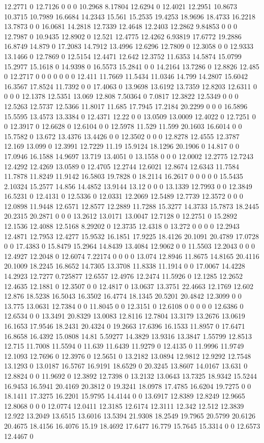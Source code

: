 12.2771 0 12.7126 0 0 0 10.2968 8.17804 12.6294 0 12.4021 12.2951 10.8673 10.3715 10.7989 16.6684 14.2343 15.561 15.2535 19.4253 18.9696 18.4733 16.2218 13.7873 0 0 16.0681 14.2818 12.7339 12.4648 12.2403 12.2862 9.84853 0 0 0 12.7987 0 10.9435 12.8902 0 12.521 12.4775 12.4262 6.93819 17.6772 19.2886 16.8749 14.879 0 17.2083 14.7912 13.4996 12.6296 12.7809 0 12.3058 0 0 12.9333 13.1466 0 12.7869 0 12.5154 12.4471 12.642 12.3752 11.6353 14.5874 15.0799 15.2977 15.1618 0 14.9398 0 16.5573 15.2841 0 0 14.2164 13.7286 0 12.8826 12.485 0 12.2717 0 0 0 0 0 0 0 12.411 11.7669 11.5434 11.0346 14.799 14.2807 15.6042 16.3567 17.8524 11.7392 0 0 17.4063 0 13.9698 13.6192 13.7359 12.8203 12.6311 0 0 0 0 12.1378 12.5351 13.069 12.808 7.50364 0 7.0817 12.3822 12.5349 0 0 0 12.5263 12.5737 12.5366 11.8017 11.685 17.7945 17.2184 20.2299 0 0 0 16.5896 15.5595 13.4573 13.3384 0 12.4371 12.22 0 0 13.0509 13.0009 12.4022 0 12.7251 0 0 12.3917 0 12.6628 0 12.6104 0 0 12.5978 11.529 11.599 20.1603 16.6014 0 0 15.7582 0 13.672 13.4376 13.4426 0 0 12.3502 0 0 0 12.8278 12.4555 12.3787 12.169 13.099 0 12.3991 12.7229 11.19 15.9124 18.1296 20.1906 0 14.817 0 0 17.0946 16.1588 14.9697 13.719 13.4051 0 13.1558 0 0 0 12.0002 12.2775 12.7243 12.4292 12.4269 13.0589 0 12.4705 12.2744 12.6021 12.8674 12.6343 11.7584 11.7878 11.8249 11.9142 16.5803 19.7828 0 18.2114 16.2617 0 0 0 0 0 15.5435 2.10324 15.2577 14.856 14.4852 13.9144 13.12 0 0 0 13.1339 12.7993 0 0 12.3849 16.5231 0 12.4131 0 12.5336 0 12.0331 12.2069 12.5489 12.7739 12.3572 0 0 0 12.0898 11.9448 12.6571 12.8577 12.2889 11.7288 15.3277 14.3733 15.7873 18.2445 20.2315 20.2871 0 0 0 13.2612 13.0171 13.0047 12.7128 0 12.2751 0 15.2892 12.1536 12.4088 12.5168 8.29202 0 12.3735 12.4318 0 13.272 0 0 0 0 12.2943 12.4871 12.7953 12.4277 15.9532 16.1851 17.9225 18.4126 20.1091 20.4789 17.0728 0 0 17.4383 0 15.8479 15.2964 14.8439 13.4084 12.9062 0 0 11.5503 12.2043 0 0 0 12.4927 12.2048 0 12.6074 7.22174 0 0 0 0 13.074 12.8946 11.8675 14.8165 20.4116 20.1009 18.2245 16.8652 14.7305 13.3708 11.8338 11.1914 0 0 17.0067 14.4228 14.2923 12.7277 0.725877 12.6557 12.4976 12.2474 11.5926 0 12.1285 12.2652 12.4635 12.1881 0 12.3507 0 0 12.4817 0 13.0637 13.3751 22.4663 12.1769 12.602 12.876 18.5238 16.5043 16.3502 16.4774 18.1345 20.5201 20.4842 12.3099 0 0 13.775 13.0631 12.7384 0 0 11.8045 0 0 12.3151 0 12.6108 0 0 0 0 0 12.6386 0 12.6534 0 0 13.3491 20.8329 13.0083 12.8116 12.7804 13.3179 13.2676 13.0619 16.1653 17.9546 18.2431 20.4324 0 19.2663 17.6396 16.1533 11.8957 0 17.6471 16.8658 16.4392 15.0808 14.81 5.59277 14.3829 13.9316 13.3847 1.55799 12.8513 12.715 11.7008 11.5594 0 11.639 11.6439 11.9279 0 12.4135 0 11.9996 11.9749 12.1093 12.7696 0 12.3976 0 12.5651 0 13.2182 13.0894 12.9812 12.9292 12.7548 13.1293 0 13.0187 16.5767 16.9191 18.6529 0 20.3245 13.8607 14.0167 13.631 0 12.8824 0 0 11.9692 0 12.3892 12.7398 0 13.2132 13.0643 13.7325 18.9342 15.5244 16.9453 16.5941 20.4169 20.3812 0 19.3241 18.0978 17.4785 16.6204 19.7275 0 0 18.1411 17.3275 16.2201 15.9795 14.4144 0 0 13.6917 12.8389 12.8249 12.9665 12.8068 0 0 0 12.0774 12.0411 12.3185 12.6174 12.3111 12.342 12.512 12.3839 12.922 13.2049 13.6515 13.6016 13.5394 21.9308 18.2549 19.7965 20.5799 20.6126 20.4675 18.4156 16.4076 15.19 18.4692 17.6477 16.779 15.7645 15.3314 0 0 12.6573 12.4467 0 